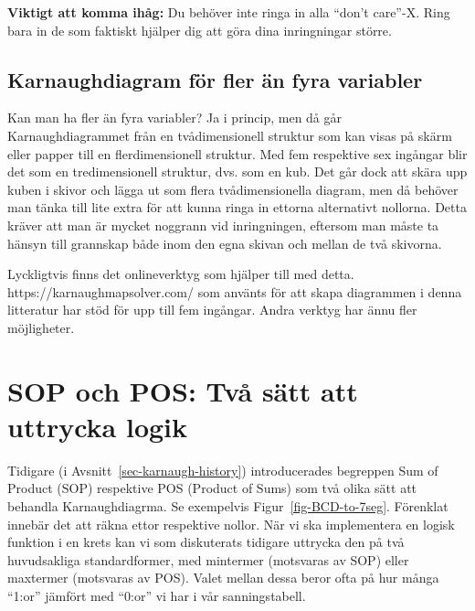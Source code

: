 \documentclass[
  swedish,
  letterpaper,
  oneside,
  openany]{book}
\begin{document}
\begin{tcolorbox}[enhanced jigsaw, arc=.35mm, bottomrule=.15mm, bottomtitle=1mm, breakable, colback=white, colbacktitle=quarto-callout-tip-color!10!white, colframe=quarto-callout-tip-color-frame, coltitle=black, left=2mm, leftrule=.75mm, opacityback=0, opacitybacktitle=0.6, rightrule=.15mm, title=\textcolor{quarto-callout-tip-color}{\faLightbulb}\hspace{0.5em}{Behöver alla X hanteras?}, titlerule=0mm, toprule=.15mm, toptitle=1mm]

\textbf{Viktigt att komma ihåg:} Du behöver inte ringa in alla ``don't
care''-X. Ring bara in de som faktiskt hjälper dig att göra dina
inringningar större.

\end{tcolorbox}

\subsection{Karnaughdiagram för fler än fyra
variabler}\label{karnaughdiagram-fuxf6r-fler-uxe4n-fyra-variabler}

Kan man ha fler än fyra variabler? Ja i princip, men då går
Karnaughdiagrammet från en tvådimensionell struktur som kan visas på
skärm eller papper till en flerdimensionell struktur. Med fem respektive
sex ingångar blir det som en tredimensionell struktur, dvs. som en kub.
Det går dock att skära upp kuben i skivor och lägga ut som flera
tvådimensionella diagram, men då behöver man tänka till lite extra för
att kunna ringa in ettorna alternativt nollorna. Detta kräver att man är
mycket noggrann vid inringningen, eftersom man måste ta hänsyn till
grannskap både inom den egna skivan och mellan de två skivorna.

Lyckligtvis finns det onlineverktyg som hjälper till med detta.
https://karnaughmapsolver.com/ som använts för att skapa diagrammen i
denna litteratur har stöd för upp till fem ingångar. Andra verktyg har
ännu fler möjligheter.

\section{SOP och POS: Två sätt att uttrycka logik}\label{sec-SOP-POS}

Tidigare (i Avsnitt~\ref{sec-karnaugh-history}) introducerades begreppen
Sum of Product (SOP) respektive POS (Product of Sums) som två olika sätt
att behandla Karnaughdiagrma. Se exempelvis Figur~\ref{fig-BCD-to-7seg}.
Förenklat innebär det att räkna ettor respektive nollor. När vi ska
implementera en logisk funktion i en krets kan vi som diskuterats
tidigare uttrycka den på två huvudsakliga standardformer, med mintermer
(motsvaras av SOP) eller maxtermer (motsvaras av POS). Valet mellan
dessa beror ofta på hur många ``1:or'' jämfört med ``0:or'' vi har i vår
sanningstabell.
\end{document}
